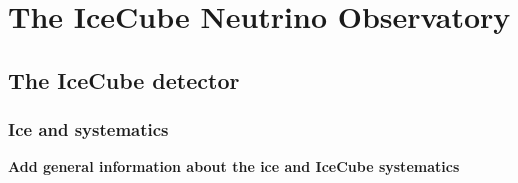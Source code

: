 \chapter{The IceCube Neutrino Observatory}
\section{The IceCube detector}

\begingroup
\graphicspath{{results/HESE_Final_Paper/}}

\endgroup

\subsection{Ice and systematics}
\textbf{Add general information about the ice and IceCube systematics}
